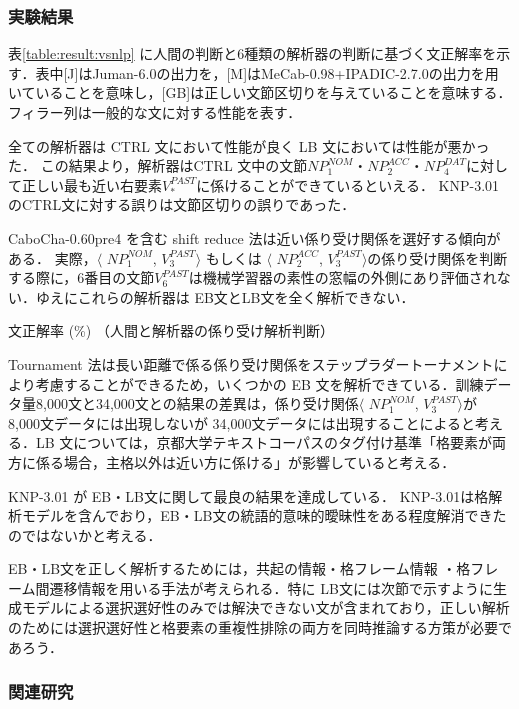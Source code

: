 \documentclass[japanese]{jnlp_1.4}
\begin{document}
\subsubsection{実験結果}

表\ref{table:result:vsnlp} に人間の判断と6種類の解析器の判断に基づく文正解率を示す．表中[J]はJuman-6.0の出力を，[M]はMeCab-0.98+IPADIC-2.7.0の出力を用いていることを意味し，[GB]は正しい文節区切りを与えていることを意味する．フィラー列は一般的な文に対する性能を表す．

全ての解析器は CTRL 文において性能が良く LB 文においては性能が悪かった．
この結果より，解析器はCTRL 文中の文節$NP^{NOM}_1$・$NP^{ACC}_2$・$NP^{DAT}_4$に対して正しい最も近い右要素$V^{PAST}_*$に係けることができているといえる． KNP-3.01のCTRL文に対する誤りは文節区切りの誤りであった．

CaboCha-0.60pre4 を含む shift reduce 法は近い係り受け関係を選好する傾向がある．
実際，$\langle$ $NP^{NOM}_1$, $V^{PAST}_3 \rangle$ もしくは $\langle$ $NP^{ACC}_2$, $V^{PAST}_3 \rangle$の係り受け関係を判断する際に，6番目の文節$V^{PAST}_6$は機械学習器の素性の窓幅の外側にあり評価されない．ゆえにこれらの解析器は EB文とLB文を全く解析できない．

\begin{table}[t]
\caption{文正解率 (\%) （人間と解析器の係り受け解析判断）}
 \label{table:result:vsnlp}

\end{table}

Tournament 法は長い距離で係る係り受け関係をステップラダートーナメントにより考慮することができるため，いくつかの EB 文を解析できている．訓練データ量8,000文と34,000文との結果の差異は，係り受け関係$\langle$ $NP^{NOM}_1$, $V^{PAST}_3 \rangle$が 8,000文データには出現しないが 34,000文データには出現することによると考える．LB 文については，京都大学テキストコーパスのタグ付け基準「格要素が両方に係る場合，主格以外は近い方に係ける」が影響していると考える．

KNP-3.01 が EB・LB文に関して最良の結果を達成している．
KNP-3.01は格解析モデル\cite{Kawahara06}を含んでおり，EB・LB文の統語的意味的曖昧性をある程度解消できたのではないかと考える．

EB・LB文を正しく解析するためには，共起の情報\cite{Abekawa06}・格フレーム情報
\cite{Kawahara06}・格フレーム間遷移情報\cite{Kawahara09}を用いる手法が考えられる．特に LB文には次節で示すように生成モデルによる選択選好性のみでは解決できない文が含まれており，正しい解析のためには選択選好性と格要素の重複性排除の両方を同時推論する方策が必要であろう．


\subsubsection{関連研究}
\end{document}
